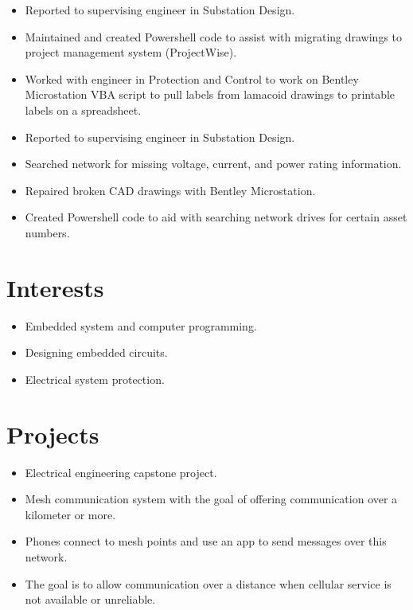 \documentclass{lsanche_cv}
\begin{document}
\begin{multicols*}{2}
	\divider

    \begin{itemize}
      \item Reported to supervising engineer in Substation Design.
      \item Maintained and created Powershell code to assist with migrating drawings to project management system (ProjectWise).
      \item Worked with engineer in Protection and Control to work on Bentley Microstation VBA script to pull labels from lamacoid drawings to printable labels on a spreadsheet.
    \end{itemize}

    \divider

    \begin{itemize}
      \item Reported to supervising engineer in Substation Design.
      \item Searched network for missing voltage, current, and power rating information.
      \item Repaired broken CAD drawings with Bentley Microstation.
      \item Created Powershell code to aid with searching network drives for certain asset numbers.
    \end{itemize}

    \columnbreak
    
  \section{Interests}
    \begin{itemize}
      \item Embedded system and computer programming.
      \item Designing embedded circuits.
			\item Electrical system protection.
    \end{itemize}

    \section{Projects}

      \begin{itemize}
        \item Electrical engineering capstone project.
        \item Mesh communication system with the goal of offering communication over a kilometer or more. 
        \item Phones connect to mesh points and use an app to send messages over this network.
        \item The goal is to allow communication over a distance when cellular service is not available or unreliable.
      \end{itemize}


\end{multicols*}
\end{document}
